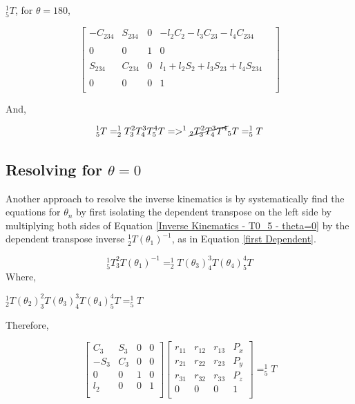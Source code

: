 \documentclass[transmag]{IEEEtran}
\begin{document}
\begin{eqfloat}

$^1_5T$, for $\theta = 180$,

\begin{equation}
\begin{bmatrix}
-C_{234}
& 
S_{234}
& 
0
& 
-l_2 C_2 - l_3 C_{23} - l_4 C_{234} \\
&&&&
\\
0    
& 
0
& 
1
& 
0
\\
&&&&
\\
S_{234}
&
C_{234}
&
0
&
l_1 + l_2 S_2 + l_3 S_{23} + l_4 S_{234} 
\\
&&&&
\\
0           & 0            & 0      & 1   \\
\end{bmatrix}
\label{Inverse Kinematics - T0_5 - theta=180}
\end{equation}

And,

\begin{equation}
^1_5T = ^1_2T  ^2_3T  ^3_4T  ^4_5T => ^1 \cancel{_2T  ^2_3T  ^3_4T  ^4} _5T = ^1_5T
\end{equation}
\end{eqfloat}

\subsection{Resolving for $\theta=0$}

Another approach to resolve the inverse kinematics is by systematically find the equations for $\theta_n$ by first isolating the dependent transpose on the left side by multiplying both sides of Equation \ref{Inverse Kinematics - T0_5 - theta=0} by the dependent transpose inverse $^1_2T(\theta_1)^{-1}$, as in Equation \ref{first Dependent}.


\begin{equation}
^1_5T ^2_3T(\theta_1)^{-1} = ^1_2T(\theta_3)  ^3_4T(\theta_4)  ^4_5T 
\label{first Dependent}
\end{equation}
Where,
\begin{center}
$^1_2T(\theta_2)  ^2_3T(\theta_3)  ^3_4T(\theta_4)  ^4_5T = ^1_5T$
\end{center}
Therefore,


\begin{equation}
\begin{bmatrix}
C_3 & S_3      & 0 &0  \\
-S_3           & C_3            & 0     & 0   \\
0 & 0  & 1      & 0   \\
l_2           & 0            & 0      & 1   \\
\end{bmatrix}
\begin{bmatrix}
r_{11} & r_{12} & r_{13} & P_x   \\
r_{21} & r_{22} & r_{23} & P_y   \\
r_{31} & r_{32} & r_{33} & P_z   \\
0      & 0      & 0      & 1     \\
\end{bmatrix}
=
^1_5T
\end{equation}
\end{document}
